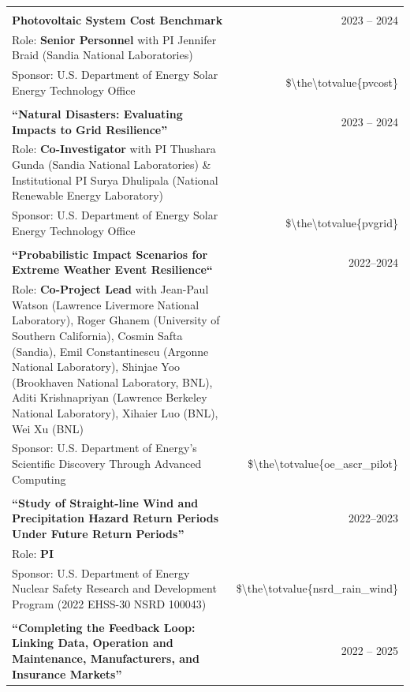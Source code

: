 \documentclass{article}[12pt]
\begin{document}
\begin{tabularx}{\textwidth}{Xr}
			\\
			\\
			\textbf{Photovoltaic System Cost Benchmark} & 2023 -- 2024 \\
			Role: \textbf{Senior Personnel} with PI Jennifer Braid (Sandia National Laboratories) & \\ 
			Sponsor: U.S. Department of Energy Solar Energy Technology Office & \$\num{\the\totvalue{pvcost}}
			\\
			\\
			\textbf{``Natural Disasters: Evaluating Impacts to Grid Resilience''} & 2023 -- 2024 \\
			Role: \textbf{Co-Investigator} with PI Thushara Gunda (Sandia National Laboratories) \& Institutional PI Surya Dhulipala (National Renewable Energy Laboratory) & \\ 
			Sponsor: U.S. Department of Energy Solar Energy Technology Office &  \$\num{\the\totvalue{pvgrid}} 
			\\
			\\
			\textbf{``Probabilistic Impact Scenarios for Extreme Weather Event Resilience``} & 2022--2024\\
			Role: \textbf{Co-Project Lead} with Jean-Paul Watson (Lawrence Livermore National Laboratory), Roger Ghanem (University of Southern California), Cosmin Safta (Sandia), Emil Constantinescu (Argonne National Laboratory), Shinjae Yoo (Brookhaven National Laboratory, BNL), Aditi Krishnapriyan (Lawrence Berkeley National Laboratory), Xihaier Luo (BNL), Wei Xu (BNL) & \\
			Sponsor: U.S. Department of Energy's Scientific Discovery Through Advanced Computing & \$\num{\the\totvalue{oe_ascr_pilot}}
			\\
			\\
			\textbf{``Study of Straight-line Wind and Precipitation Hazard Return Periods Under Future Return Periods''} & 2022--2023 \\
			Role: \textbf{PI} & \\
			Sponsor: U.S. Department of Energy Nuclear Safety Research and Development  Program (2022 EHSS-30 NSRD 100043) & \$\num{\the\totvalue{nsrd_rain_wind}}  
			\\
			\\
			\textbf{``Completing the Feedback Loop: Linking Data, Operation and Maintenance, Manufacturers, and Insurance Markets''} & 2022 -- 2025 \\

\end{tabularx}
\end{document}

